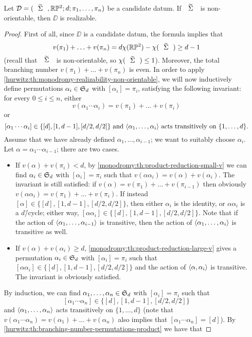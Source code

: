 \begin{theorem}\label{monodromy:th:realizability-projective-plane}
Let $\DD=\datum{\tSigma,\RP[2]}{d}{\pi_1,\ldots,\pi_n}$ be a candidate datum. If $\tSigma$ is non-orientable, then $\DD$ is realizable.
\end{theorem}
\begin{proof}
First of all, since $\DD$ is a candidate datum, the \RH{} formula implies that
\[
v(\pi_1)+\ldots+v(\pi_n)=d\chi(\RP[2])-\chi(\tSigma)\ge d-1
\]
(recall that $\tSigma$ is non-orientable, so $\chi(\tSigma)\le 1$). Moreover, the total branching number $v(\pi_1)+\ldots+v(\pi_n)$ is even. In order to apply \cref{hurwitz:th:monodromy-realizability-non-orientable}, we will now inductively define permutations $\alpha_i\in\symgroup[d]$ with $[\alpha_i]=\pi_i$, satisfying the following invariant: for every $0\le i\le n$, either
\[
v(\alpha_1\cdots\alpha_i)=v(\pi_1)+\ldots+v(\pi_i)
\]
or
\[
\text{$[\alpha_1\cdots\alpha_i]\in\{[d],[1,d-1],[d/2,d/2]\}$ and $\left\langle\alpha_1,\ldots,\alpha_i\right\rangle$ acts transitively on $\{1,\ldots,d\}$.}
\]
Assume that we have already defined $\alpha_1,\ldots,\alpha_{i-1}$; we want to suitably choose $\alpha_i$. Let $\alpha=\alpha_1\cdots\alpha_{i-1}$; there are two cases.
\begin{itemize}
\item If $v(\alpha)+v(\pi_i)<d$, by \cref{monodromy:th:product-reduction-small-v} we can find $\alpha_i\in\symgroup[d]$ with $[\alpha_i]=\pi_i$ such that $v(\alpha\alpha_i)=v(\alpha)+v(\alpha_i)$. The invariant is still satisfied: if $v(\alpha)=v(\pi_1)+\ldots+v(\pi_{i-1})$ then obviously $v(\alpha\alpha_i)=v(\pi_1)+\ldots+v(\pi_i)$. If instead $[\alpha]\in\{[d],[1,d-1],[d/2,d/2]\}$, then either $\alpha_i$ is the identity, or $\alpha\alpha_i$ is a $d$\=/cycle; either way, $[\alpha\alpha_i]\in\{[d],[1,d-1],[d/2,d/2]\}$. Note that if the action of $\left\langle\alpha_1,\ldots,\alpha_{i-1}\right\rangle$ is transitive, then the action of $\left\langle\alpha_1,\ldots,\alpha_i\right\rangle$ is transitive as well.
\item If $v(\alpha)+v(\alpha_i)\ge d$, \cref{monodromy:th:product-reduction-large-v} gives a permutation $\alpha_i\in\symgroup[d]$ with $[\alpha_i]=\pi_i$ such that $[\alpha\alpha_i]\in\{[d],[1,d-1],[d/2,d/2]\}$ and the action of $\left\langle\alpha,\alpha_i\right\rangle$ is transitive. The invariant is obviously satisfied.
\end{itemize}
By induction, we can find $\alpha_1,\ldots,\alpha_n\in\symgroup[d]$ with $[\alpha_i]=\pi_i$ such that
\[
[\alpha_1\cdots\alpha_n]\in\{[d],[1,d-1],[d/2,d/2]\}
\]
and $\left\langle\alpha_1,\ldots,\alpha_n\right\rangle$ acts transitively on $\{1,\ldots,d\}$ (note that $v(\alpha_1\cdots\alpha_n)=v(\alpha_1)+\ldots+v(\alpha_n)$ also implies that $[\alpha_1\cdots\alpha_n]=[d]$). By \cref{hurwitz:th:branching-number-permutations-product} we have that

\end{proof}
